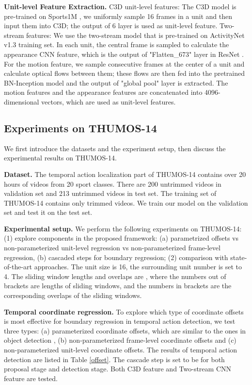 \documentclass{bmvc2k}
\begin{document}
\textbf{Unit-level Feature Extraction.} C3D unit-level features: The C3D model is pre-trained on Sports1M \cite{Karpathy_2014_CVPR}, we uniformly sample 16 frames in a unit and then input them into C3D; the output of 6 layer is used as unit-level feature. Two-stream features: We use the two-stream model \cite{xiong2016cuhk} that is pre-trained on ActivityNet v1.3 training set. In each unit, the central frame is sampled to calculate the appearance CNN feature, which is the output of  "Flatten\_673" layer in ResNet \cite{he2016deep}. For the motion feature, we sample  consecutive frames at the center of a unit and calculate optical flows \cite{farneback2003two} between them; these flows are then fed into the pretrained BN-Inception model \cite{xiong2016cuhk,ioffe2015batch} and the output of "global pool" layer is extracted. The motion features and the appearance features are concatenated into 4096-dimensional vectors, which are used as unit-level features.

\subsection{Experiments on THUMOS-14}
We first introduce the datasets and the experiment setup, then discuss the experimental results on THUMOS-14.

\textbf{Dataset.} The temporal action localization part of THUMOS-14 contains over 20 hours of videos from 20 sport classes. There are 200 untrimmed videos in validation set and 213 untrimmed  videos in test set. The training set of THUMOS-14 contains only trimmed videos. We train our model on the validation set and test it on the test set.

\textbf{Experimental setup.} We perform the following experiments on THUMOS-14: (1) explore components in the proposed framework: (a) parametrized offsets vs non-parameterized unit-level regression vs non-parameterized frame-level regression, (b) cascaded steps for boundary regression; (2) comparison with state-of-the-art approaches. The unit size  is 16, the surrounding unit number  is set to 4. The sliding window lengths and overlaps are , where the numbers out of brackets are lengths of sliding windows, and the numbers in brackets are the corresponding overlaps of the sliding windows.


\textbf{Temporal coordinate regression.}
To explore which type of coordinate offsets is most effective for boundary regression in temporal action detection, we test three types: (a) parameterized coordinate offsets, which are similar to the ones in object detection \cite{ren2015faster}, (b) non-parameterized frame-level coordinate offsets and (c) non-parameterized unit-level coordinate offsets. The results of temporal action detection are listed in Table \ref{offset}. The cascade step  is set to be  for both proposal stage and detection stage. Both C3D feature and Two-stream CNN feature are tested. 
\end{document}
